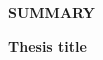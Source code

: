 \large
\noindent
\textbf{SUMMARY}

\vspace{5mm}
\noindent
\normalsize
\textbf{Thesis title}

\vspace{5mm}

\begingroup
\fontsize{12}{11}\selectfont
\noindent

\lipsum[1-3]

\endgroup



